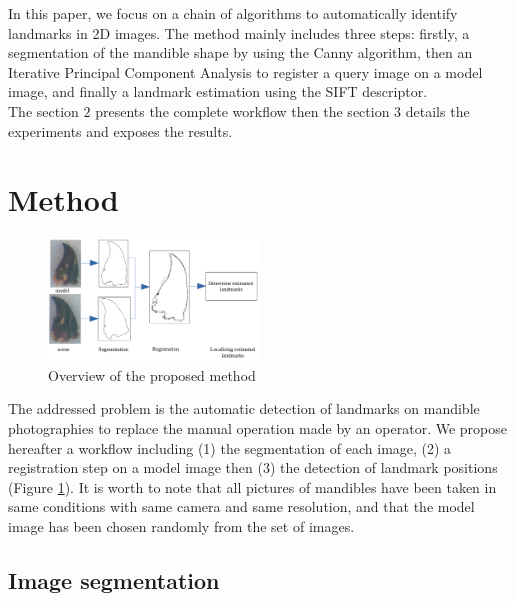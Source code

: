 \documentclass[twoside,twocolumn,10pt]{article}
\begin{document}
In this paper, we focus on a chain of algorithms to automatically identify  landmarks in 2D images. The method
mainly includes three steps: firstly, a segmentation of the mandible
shape by using the Canny algorithm, then an Iterative Principal
Component Analysis to register a query image on a model image, and
finally a landmark estimation using the SIFT descriptor.\\
The section $2$ presents the complete workflow then the section $3$ details the experiments and exposes the results. 


\section{Method}

\begin{figure}[htb]
    \centering
    \includegraphics[width=0.5\textwidth]{./images/method}
    \caption{Overview of the proposed method}
    \label{fig:method}
\end{figure}
The addressed problem is the automatic detection of landmarks on
mandible photographies to replace the manual operation made by an operator.
We propose hereafter a workflow including (1) the segmentation of each
image, (2) a registration step on a model image then (3) the detection
of landmark positions (Figure \ref{fig:method}). It is worth to note
that all pictures of mandibles have been taken
in same conditions with same camera and same resolution, and that 
the model image has been chosen randomly from the set of images. 


\subsection{Image segmentation}
\end{document}
